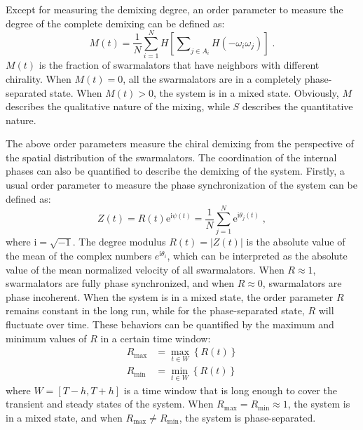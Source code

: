 \documentclass{article}
\begin{document}
Except for measuring the demixing degree, an order parameter to measure the degree of the complete demixing can be defined as:
\begin{equation}
    M\left( t \right) =\frac{1}{N}\sum_{i=1}^N{H\left[ \sum\nolimits_{j\in A_i}^{}{H\left( -\omega _i\omega _j \right)} \right]}\;.
\end{equation}
$M\left( t \right)$ is the fraction of swarmalators that have neighbors with different chirality. When $M\left( t \right)=0$, all the swarmalators are in a completely phase-separated state. When $M\left( t \right)> 0$, the system is in a mixed state. Obviously, $M$ describes the qualitative nature of the mixing, while $S$ describes the quantitative nature.

The above order parameters measure the chiral demixing from the perspective of the spatial distribution of the swarmalators. 
The coordination of the internal phases can also be quantified to describe the demixing of the system. Firstly, a usual order parameter to measure the phase synchronization of the system can be defined as: 
\begin{equation}
    Z\left( t \right) =R\left( t \right) \mathrm{e}^{\mathrm{i}\psi \left( t \right)}=\frac{1}{N}\sum_{j=1}^N{\mathrm{e}^{\mathrm{i}\theta _j\left( t \right)}}\;,
\end{equation}
where $\textrm{i}=\sqrt{-1}$. The degree modulus $R(t)=\left|Z(t)\right|$ is the absolute value of the mean of the complex numbers $e^{\textrm{i}\theta _i}$, which can be interpreted as the absolute value of the mean normalized velocity of all swarmalators. When $R\approx 1$, swarmalators are fully phase synchronized, and when $R\approx0$, swarmalators are phase incoherent.
When the system is in a mixed state, the order parameter $R$ remains constant in the long run, while for the phase-separated state, $R$ will fluctuate over time. These behaviors can be quantified by the maximum and minimum values of $R$ in a certain time window:
\begin{subequations}
    \begin{align}
        R_{\max}&=\max_{t\in W} \left\{ R\left( t \right) \right\} 
        \\
        R_{\min}&=\min_{t\in W} \left\{ R\left( t \right) \right\} 
    \end{align}
\end{subequations}
where $W=\left[ T-h,T+h \right]$ is a time window that is long enough to cover the transient and steady states of the system. When $R_{\max}=R_{\min}\approx1$, the system is in a mixed state, and when $R_{\max}\neq R_{\min}$, the system is phase-separated. 
\end{document}
